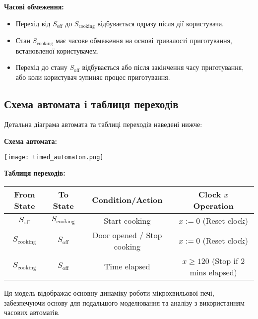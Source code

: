\documentclass[12pt,a4paper]{article}
\begin{document}
\textbf{Часові обмеження:}
\begin{itemize}
    \item Перехід від \( S_{\text{off}} \) до \( S_{\text{cooking}} \) відбувається одразу після дії користувача.
    \item Стан \( S_{\text{cooking}} \) має часове обмеження на основі тривалості приготування, встановленої користувачем.
    \item Перехід до стану \( S_{\text{off}} \) відбувається або після закінчення часу приготування, або коли користувач зупиняє процес приготування.
\end{itemize}

\subsection{Схема автомата і таблиця переходів}
Детальна діаграма автомата та таблиці переходів наведені нижче:

\vspace{0.5cm}

\textbf{Схема автомата:}

\vspace{0.5cm}

\texttt{[image: timed\_automaton.png]}

\vspace{0.5cm}

\textbf{Таблиця переходів:} \\

\vspace{0.1cm}

\begin{tabular}{|c|c|c|c|}
\hline
\textbf{From State} & \textbf{To State} & \textbf{Condition/Action} & \textbf{Clock \( x \) Operation} \\
\hline
\( S_{\text{off}} \) & \( S_{\text{cooking}} \) & Start cooking & \( x := 0 \) (Reset clock) \\
\( S_{\text{cooking}} \) & \( S_{\text{off}} \) & Door opened / Stop cooking & \( x := 0 \) (Reset clock) \\
\( S_{\text{cooking}} \) & \( S_{\text{off}} \) & Time elapsed & \( x \geq 120 \) (Stop if 2 mins elapsed) \\
\hline
\end{tabular}

\vspace{0.5cm}

Ця модель відображає основну динаміку роботи мікрохвильової печі, забезпечуючи основу для подальшого моделювання та аналізу з використанням часових автоматів.
\end{document}
